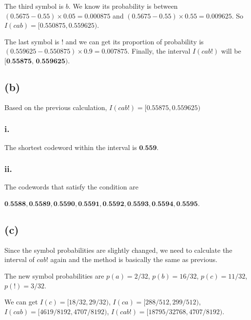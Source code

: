 \documentclass{article}
\begin{document}
The third symbol is $b$. We know its probability is between $(0.5675-0.55)\times0.05=0.000875$ and $(0.5675-0.55)\times0.55=0.009625$. So $I(cab)=[0.550875, 0.559625)$.

\vspace{3mm}

The last symbol is $!$ and we can get its proportion of probability is $(0.559625-0.550875)\times0.9=0.007875$. Finally, the interval $I(cab!)$ will be $\textbf{[0.55875, 0.559625)}$. 

\subsection*{(b)}

Based on the previous calculation, $I(cab!)=[0.55875, 0.559625)$

\subsubsection*{i.}

The shortest codeword within the interval is $\textbf{0.559}$.

\subsubsection*{ii.}

The codewords that satisfy the condition are 

\vspace{1mm}

$\textbf{0.5588$, $0.5589$, $0.5590$, $0.5591$, $0.5592$, $0.5593$, $0.5594$, $0.5595}$.

\subsection*{(c)}

Since the symbol probabilities are slightly changed, we need to calculate the interval of $cab!$ again and the method is basically the same as previous.

\vspace{2mm}

The new symbol probabilities are $p(a)=2/32$, $p(b)=16/32$, $p(c)=11/32$, $p(!)=3/32$.

\vspace{2mm}

We can get $I(c)=[18/32, 29/32)$, $I(ca)=[288/512, 299/512)$, $I(cab)=[4619/8192, 4707/8192)$, $I(cab!)=[18795/32768, 4707/8192)$.
\end{document}
